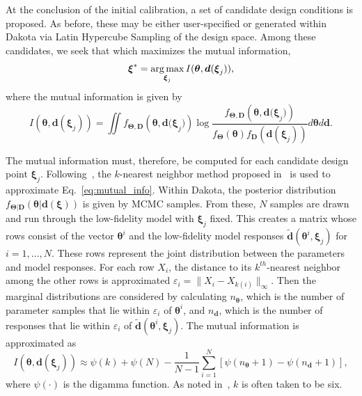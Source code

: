 At the conclusion of the initial calibration, a set of candidate design
conditions is proposed. As before, these may be either user-specified or
generated within Dakota via Latin Hypercube Sampling of the design space. Among
these candidates, we seek that which maximizes the mutual information,
\begin{equation}
\boldsymbol{\xi}^{*} = \operatorname*{arg\,max}_{\boldsymbol{\xi}_{j}} I(\boldsymbol{\theta},
\boldsymbol{d}(\boldsymbol{\xi}_{j}) ),
\end{equation}
where the mutual information is given by
\begin{equation}
I(\boldsymbol{\theta}, \boldsymbol{d}(\boldsymbol{\xi}_{j})) = \iint 
{f_{\boldsymbol{\Theta ,D}}}\left( \boldsymbol{\theta ,d(\xi}_{j}) \right)
\log \frac{ {f_{\boldsymbol{\Theta,D}}}\left( \boldsymbol{\theta,d(\xi}_{j}) 
\right)}{f_{\boldsymbol{\Theta}}\left(\boldsymbol{\theta} \right) 
f_{\boldsymbol{D}}\left(\boldsymbol{d}(\boldsymbol{\xi}_{j}) \right) }
d\boldsymbol{\theta} d\boldsymbol{d}.
\label{eq:mutual_info}
\end{equation}

The mutual information must, therefore, be computed for each candidate design 
point $\boldsymbol{\xi}_{j}$. Following~\cite{Lew16}, the $k$-nearest 
neighbor method proposed in~\cite{Kra04} is used to approximate 
Eq.~\ref{eq:mutual_info}. Within Dakota, the posterior distribution
$f_{\boldsymbol{\Theta | D}}\left(\boldsymbol{\theta | d(\xi)}\right)$ is given
by MCMC samples. From these, $N$ samples are drawn and run through the
low-fidelity model with $\boldsymbol{\xi}_{j}$ fixed. This creates a matrix 
whose rows consist of the vector $\boldsymbol{\theta}^{i}$ and the low-fidelity
model responses $\tilde{\boldsymbol{d}}(\boldsymbol{\theta}^{i}, 
\boldsymbol{\xi}_{j})$ for $i = 1, \ldots, N$. These rows 
represent the joint distribution between the parameters and model responses. 
For each row $X_{i}$, the distance to its $k^{th}$-nearest neighbor among the 
other rows is approximated $\varepsilon_{i} = \| X_{i} - X_{k(i)} \|_{\infty}$. 
Then the marginal distributions are considered by calculating  
$n_{\boldsymbol{\theta}}$, which  is the number of parameter samples that lie 
within $\varepsilon_{i}$ of $\boldsymbol{\theta}^{i}$, and 
$n_{\boldsymbol{d}}$, which is the number of responses that lie within 
$\varepsilon_{i}$ of $\tilde{\boldsymbol{d}}(\boldsymbol{\theta}^{i}, 
\boldsymbol{\xi}_{j})$. The mutual information is approximated as~\cite{Kra04}
\begin{equation}
I(\boldsymbol{\theta}, \boldsymbol{d}(\boldsymbol{\xi}_{j})) \approx
\psi(k) + \psi(N) - \frac{1}{N-1} \sum_{i = 1}^{N} \left[ 
\psi(n_{\boldsymbol{\theta}}+1) - \psi(n_{\boldsymbol{d}}+1) \right],
\end{equation}
where $\psi(\cdot)$ is the digamma function. As noted in~\cite{Lew16}, $k$ is
often taken to be six.

